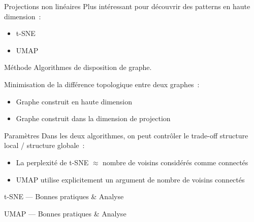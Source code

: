 \begin{frame}{Projections non linéaires}
  Plus intéressant pour découvrir des patterns en haute dimension~:

  \begin{itemize}[<+->]
    \item t-SNE
    \item UMAP
  \end{itemize}
\end{frame}

\begin{frame}{Méthode}
  Algorithmes de disposition de graphe.

  Minimisation de la différence topologique entre deux graphes~:

  \begin{itemize}[<+->]
    \item Graphe construit en haute dimension
    \item Graphe construit dans la dimension de projection
  \end{itemize}
\end{frame}

\begin{frame}{Paramètres}
  Dans les deux algorithmes, on peut contrôler le trade-off structure local / structure globale~:

  \begin{itemize}[<+->]
    \item La perplexité de t-SNE $\approx$ nombre de voisins considérés comme connectés
    \item UMAP utilise explicitement un argument de nombre de voisins connectés
  \end{itemize}
\end{frame}

\begin{frame}{t-SNE --- Bonnes pratiques \& Analyse}
\end{frame}

\begin{frame}{UMAP --- Bonnes pratiques \& Analyse}
\end{frame}

